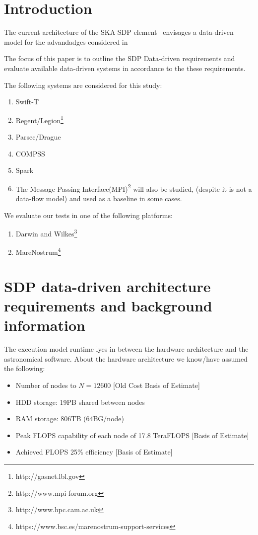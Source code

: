 \documentclass[11pt,a4paper]{article}
\title{}
\newcommand{\Nfcorr}{\ensuremath{N_{\rm f,corr}}}
\begin{document}
\sdpfrontpage

\section{Introduction}

The current architecture of the SKA SDP element~\cite{SDParch} envisages a 
data-driven model for the advandadges considered in~\cite{DDchoice}

The focus of this paper is to outline the SDP Data-driven requirements
and evaluate available data-driven systems in accordance to the these 
requirements.

The following systems are considered for this study:
\begin{enumerate}
\item Swift-T 
\item Regent/Legion\footnote{http://gasnet.lbl.gov}
\item Parsec/Drague
\item COMPSS
\item Spark
\item The Message Passing 
Interface(MPI)\footnote{http://www.mpi-forum.org} will also be studied,
(despite it is not a data-flow model) and used as a baseline in some cases.
\end{enumerate}


We evaluate our tests in one of the following platforms:
\begin{enumerate}
\item Darwin and Wilkes\footnote{ http://www.hpc.cam.ac.uk}
\item MareNostrum\footnote{https://www.bsc.es/marenostrum-support-services}
\end{enumerate}

\section{SDP data-driven architecture requirements and background information}


The execution model runtime lyes in between the hardware architecture and the astronomical software.
About the hardware architecture we know/have assumed the following:

\begin{itemize}
\item Number of nodes to $N=12600$  [Old Cost Basis of Estimate]
\item HDD storage: 19PB shared between nodes
\item RAM storage: 806TB (64BG/node)
\item Peak FLOPS capability of each node of 17.8 TeraFLOPS [Basis of Estimate]
\item Achieved FLOPS 25\% efficiency [Basis of Estimate]
\end{itemize}
\end{document}
